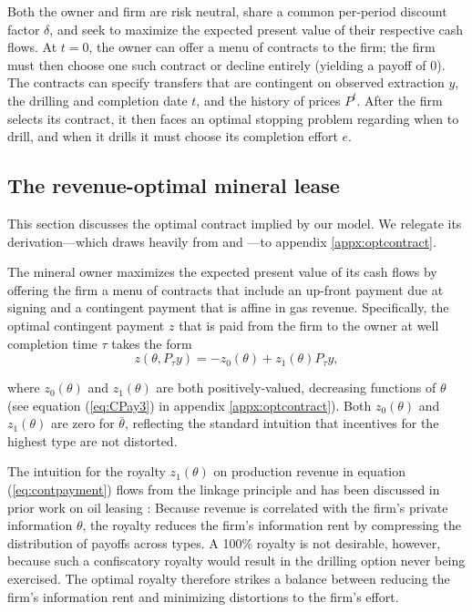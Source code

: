 \documentclass[12pt]{article}
\begin{document}
Both the owner and firm are risk neutral, share a common per-period discount factor $\delta$, and seek to maximize the expected present value of their respective cash flows. At $t=0$, the owner can offer a menu of contracts to the firm; the firm must then choose one such contract or decline entirely (yielding a payoff of 0). The contracts can specify transfers that are contingent on observed extraction $y$, the drilling and completion date $t$, and the history of prices $P^t$. After the firm selects its contract, it then faces an optimal stopping problem regarding when to drill, and when it drills it must choose its completion effort $e$.


\subsection{The revenue-optimal mineral lease \label{sec:AnalyticModelDisc}}

This section discusses the optimal contract implied by our model. We relegate its derivation---which draws heavily from \citet{bib:laffonttirole1986} and \citet{bib:board}---to appendix \ref{appx:optcontract}.

The mineral owner maximizes the expected present value of its cash flows by offering the firm a menu of contracts that include an up-front payment due at signing and a contingent payment that is affine in gas revenue. Specifically, the optimal contingent payment $z$ that is paid from the firm to the owner at well completion time $\tau$ takes the form
\begin{equation}
z(\theta,P_\tau y) = -z_0(\theta) + z_1(\theta)P_\tau y, \label{eq:contpayment}
\end{equation}

\noindent where $z_0(\theta)$ and $z_1(\theta)$ are both positively-valued, decreasing functions of $\theta$ (see equation (\ref{eq:CPay3}) in appendix \ref{appx:optcontract}). Both $z_0(\theta)$ and $z_1(\theta)$ are zero for $\bar{\theta}$, reflecting the standard intuition that incentives for the highest type are not distorted.

The intuition for the royalty $z_1(\theta)$ on production revenue in equation (\ref{eq:contpayment}) flows from the linkage principle \citep{bib:milgromweber, bib:riley, bib:demarzo} and has been discussed in prior work on oil leasing \citep{bib:hendricksporterguofo,bib:bhattacharya,bib:ordin}: Because revenue is correlated with the firm's private information $\theta$, the royalty reduces the firm's information rent by compressing the distribution of payoffs across types. A 100\% royalty is not desirable, however, because such a confiscatory royalty would result in the drilling option never being exercised. The optimal royalty therefore strikes a balance between reducing the firm's information rent and minimizing distortions to the firm's effort.
\end{document}
